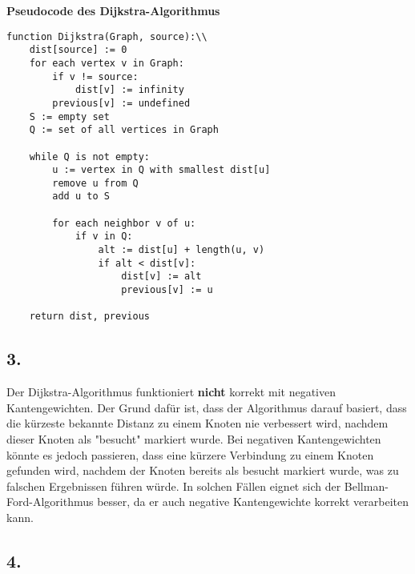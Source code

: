 \documentclass[a4paper]{scrartcl}
\begin{document}
\textbf{Pseudocode des Dijkstra-Algorithmus}

\begin{verbatim}
function Dijkstra(Graph, source):\\
    dist[source] := 0
    for each vertex v in Graph:
        if v != source:
            dist[v] := infinity
        previous[v] := undefined
    S := empty set
    Q := set of all vertices in Graph
    
    while Q is not empty:
        u := vertex in Q with smallest dist[u]
        remove u from Q
        add u to S
        
        for each neighbor v of u:
            if v in Q:
                alt := dist[u] + length(u, v)
                if alt < dist[v]:
                    dist[v] := alt
                    previous[v] := u
                    
    return dist, previous
  \end{verbatim}
\subsection*{3.}
Der Dijkstra-Algorithmus funktioniert \textbf{nicht} korrekt mit negativen Kantengewichten. Der Grund dafür ist, dass der Algorithmus darauf basiert, dass die kürzeste bekannte Distanz zu einem Knoten nie verbessert wird, nachdem dieser Knoten als "besucht" markiert wurde. Bei negativen Kantengewichten könnte es jedoch passieren, dass eine kürzere Verbindung zu einem Knoten gefunden wird, nachdem der Knoten bereits als besucht markiert wurde, was zu falschen Ergebnissen führen würde. In solchen Fällen eignet sich der Bellman-Ford-Algorithmus besser, da er auch negative Kantengewichte korrekt verarbeiten kann.
\subsection*{4.}
\begin{table}[htbp]
  \centering
  
\end{table}
\end{document}
